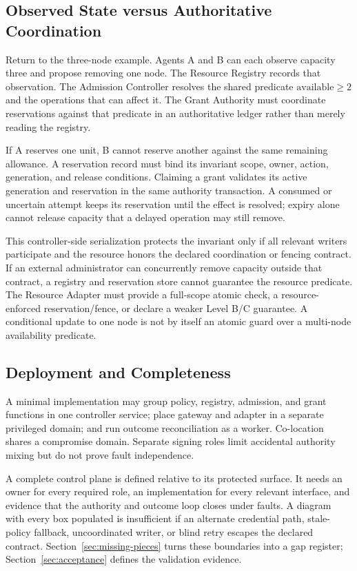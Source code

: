\subsection{Observed State versus Authoritative Coordination}
Return to the three-node example. Agents A and B can each observe capacity three and propose removing one node. The Resource Registry records that observation. The Admission Controller resolves the shared predicate $\mathrm{available}\ge2$ and the operations that can affect it. The Grant Authority must coordinate reservations against that predicate in an authoritative ledger rather than merely reading the registry.

If A reserves one unit, B cannot reserve another against the same remaining allowance. A reservation record must bind its invariant scope, owner, action, generation, and release conditions. Claiming a grant validates its active generation and reservation in the same authority transaction. A consumed or uncertain attempt keeps its reservation until the effect is resolved; expiry alone cannot release capacity that a delayed operation may still remove.

This controller-side serialization protects the invariant only if all relevant writers participate and the resource honors the declared coordination or fencing contract. If an external administrator can concurrently remove capacity outside that contract, a registry and reservation store cannot guarantee the resource predicate. The Resource Adapter must provide a full-scope atomic check, a resource-enforced reservation/fence, or declare a weaker Level B/C guarantee. A conditional update to one node is not by itself an atomic guard over a multi-node availability predicate.

\subsection{Deployment and Completeness}
A minimal implementation may group policy, registry, admission, and grant functions in one controller service; place gateway and adapter in a separate privileged domain; and run outcome reconciliation as a worker. Co-location shares a compromise domain. Separate signing roles limit accidental authority mixing but do not prove fault independence.

A complete control plane is defined relative to its protected surface. It needs an owner for every required role, an implementation for every relevant interface, and evidence that the authority and outcome loop closes under faults. A diagram with every box populated is insufficient if an alternate credential path, stale-policy fallback, uncoordinated writer, or blind retry escapes the declared contract. Section~\ref{sec:missing-pieces} turns these boundaries into a gap register; Section~\ref{sec:acceptance} defines the validation evidence.
